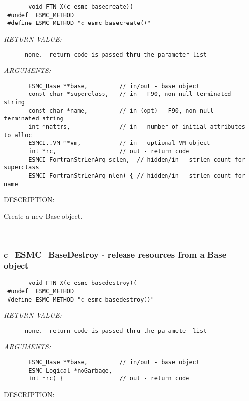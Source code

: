   
\begin{verbatim}       void FTN_X(c_esmc_basecreate)(
 #undef  ESMC_METHOD
 #define ESMC_METHOD "c_esmc_basecreate()"\end{verbatim}{\em RETURN VALUE:}
\begin{verbatim}      none.  return code is passed thru the parameter list
   \end{verbatim}{\em ARGUMENTS:}
\begin{verbatim}       ESMC_Base **base,         // in/out - base object
       const char *superclass,   // in - F90, non-null terminated string
       const char *name,         // in (opt) - F90, non-null terminated string
       int *nattrs,              // in - number of initial attributes to alloc
       ESMCI::VM **vm,           // in - optional VM object
       int *rc,                  // out - return code
       ESMCI_FortranStrLenArg sclen,  // hidden/in - strlen count for superclass
       ESMCI_FortranStrLenArg nlen) { // hidden/in - strlen count for name
   \end{verbatim}
{\sf DESCRIPTION:\\ }


       Create a new Base object.
   
 
\mbox{}\hrulefill\ 
 
\subsubsection [c\_ESMC\_BaseDestroy] {c\_ESMC\_BaseDestroy - release resources from a Base object}


  
\begin{verbatim}       void FTN_X(c_esmc_basedestroy)(
 #undef  ESMC_METHOD
 #define ESMC_METHOD "c_esmc_basedestroy()"\end{verbatim}{\em RETURN VALUE:}
\begin{verbatim}      none.  return code is passed thru the parameter list
   \end{verbatim}{\em ARGUMENTS:}
\begin{verbatim}       ESMC_Base **base,         // in/out - base object
       ESMC_Logical *noGarbage,
       int *rc) {                // out - return code
   \end{verbatim}
{\sf DESCRIPTION:\\ }



